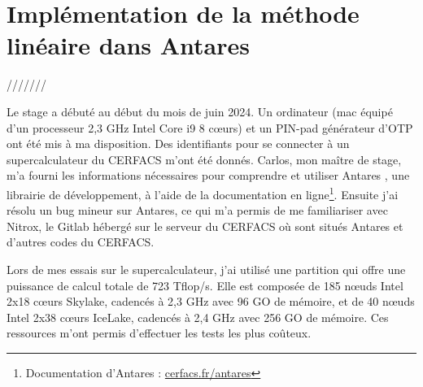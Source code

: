 \chapter{Implémentation de la méthode linéaire dans Antares}

/////// \cite{alexis}




Le stage a débuté au début du mois de juin 2024. Un ordinateur (mac équipé d'un processeur 2,3 GHz Intel Core i9 8 cœurs) et un PIN-pad générateur d'\ac{OTP} ont été mis à ma disposition. Des identifiants pour se connecter à un supercalculateur du CERFACS m'ont été donnés. Carlos, mon maître de stage, m'a fourni les informations nécessaires pour comprendre et utiliser Antares \cite{antares}, une librairie de développement, à l'aide de la documentation en ligne\footnote{Documentation d'Antares : \href{https://cerfacs.fr/antares/}{cerfacs.fr/antares}}. Ensuite j'ai résolu un bug mineur sur Antares, ce qui m'a permis de me familiariser avec Nitrox, le Gitlab hébergé sur le serveur du CERFACS où sont situés Antares et d'autres codes du CERFACS.

Lors de mes essais sur le supercalculateur, j'ai utilisé une partition qui offre une puissance de calcul totale de 723 Tflop/s. Elle est composée de 185 nœuds Intel 2x18 cœurs Skylake, cadencés à 2,3 GHz avec 96 GO de mémoire, et de 40 nœuds Intel 2x38 cœurs IceLake, cadencés à 2,4 GHz avec 256 GO de mémoire. Ces ressources m'ont permis d'effectuer les tests les plus coûteux.

